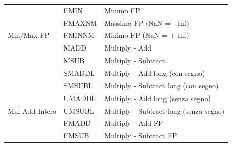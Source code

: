 \documentclass[12pt,a4paper]{article}
\begin{document}
\begin{longtable}{|l|l|l|}
                                                                                      & FMIN                                                 & Minimo FP                                               \\ \cline{2-3} 
                                                                                      & FMAXNM                                               & Massimo FP (NaN = - Inf)                                \\ \cline{2-3} 
\multirow{-4}{*}{Min/Max FP}                                                          & FMINNM                                               & Minimo FP (NaN = + Inf)                                 \\ \hline
                                                                                      & MADD                                                 & Multiply - Add                                          \\ \cline{2-3} 
                                                                                      & MSUB                                                 & Multiply - Subtract                                     \\ \cline{2-3} 
                                                                                      & SMADDL                                               & Multiply - Add long (con segno)                         \\ \cline{2-3} 
                                                                                      & SMSUBL                                               & Multiply - Subtract long (con segno)                    \\ \cline{2-3} 
                                                                                      & UMADDL                                               & Multiply - Add long (senza segno)                       \\ \cline{2-3} 
\multirow{-6}{*}{Mul-Add Intero}                                                      & UMSUBL                                               & Multiply - Subtract long (senza segno)                  \\ \hline
                                                                                      & FMADD                                                & Multiply - Add FP                                       \\ \cline{2-3} 
                                                                                      & FMSUB                                                & Multiply - Subtract FP                                  \\ \cline{2-3} 

\end{longtable}
\end{document}
